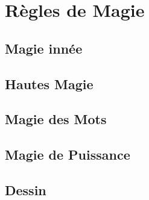 \section{Règles de Magie}
\subsection{Magie innée}
\subsection{Hautes Magie}
\subsection{Magie des Mots}
\subsection{Magie de Puissance}
\subsection{Dessin}
